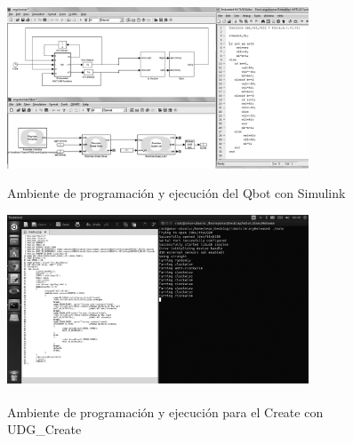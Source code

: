 \documentclass[letterpaper,openright,12pt]{book}
\begin{document}
\begin{figure}
\begin{center}
\includegraphics[width=0.8\textwidth]{figures/qbotworkspace.png}
\caption{Ambiente de programación y ejecución del Qbot con Simulink}
\centering
\label{fig:qbotWorkspace}
\end{center}
\end{figure} 

\begin{figure}
\begin{center}
\includegraphics[width=0.8\textwidth]{figures/createWorkspace.png}
\caption{Ambiente de programación y ejecución para el Create\textsuperscript{\textregistered} con UDG\_Create}
\centering
\label{fig:createWorkspace}
\end{center}
\end{figure} 
\end{document}
